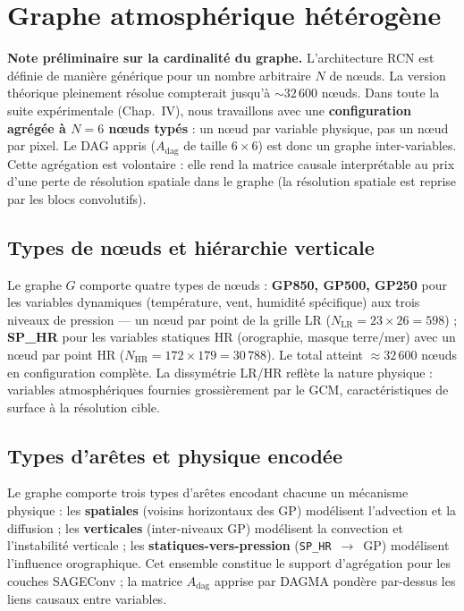 \documentclass[14pt,a4paper,openany]{extreport}
\theoremstyle{definition}
\newcommand{\LR}{\ensuremath{\text{LR}}}
\newcommand{\HR}{\ensuremath{\text{HR}}}
\newcommand{\Adag}{\ensuremath{A_{\mathrm{dag}}}}
\begin{document}
\section{Graphe atmosphérique hétérogène}
\label{sec:oracle-graphe}

\noindent\textbf{Note préliminaire sur la cardinalité du graphe.} L'architecture RCN est définie de manière générique pour un nombre arbitraire $N$ de nœuds. La version théorique pleinement résolue compterait jusqu'à ${\sim}32\,600$ nœuds. Dans toute la suite expérimentale (Chap.~IV), nous travaillons avec une \textbf{configuration agrégée à $N = 6$ nœuds typés} : un nœud par variable physique, pas un nœud par pixel. Le DAG appris ($A_{\mathrm{dag}}$ de taille $6 \times 6$) est donc un graphe inter-variables. Cette agrégation est volontaire : elle rend la matrice causale interprétable au prix d'une perte de résolution spatiale dans le graphe (la résolution spatiale est reprise par les blocs convolutifs).

\subsection{Types de nœuds et hiérarchie verticale}
\label{ssec:oracle-types-noeuds}

Le graphe $G$ comporte quatre types de nœuds : \textbf{GP850, GP500, GP250} pour les variables dynamiques (température, vent, humidité spécifique) aux trois niveaux de pression --- un nœud par point de la grille LR ($N_{\LR} = 23\times 26 = 598$) ; \textbf{SP\_HR} pour les variables statiques HR (orographie, masque terre/mer) avec un nœud par point HR ($N_{\HR} = 172\times 179 = 30\,788$). Le total atteint $\approx 32\,600$ nœuds en configuration complète. La dissymétrie LR/HR reflète la nature physique : variables atmosphériques fournies grossièrement par le GCM, caractéristiques de surface à la résolution cible.

\subsection{Types d'arêtes et physique encodée}
\label{ssec:oracle-types-aretes}

Le graphe comporte trois types d'arêtes encodant chacune un mécanisme physique : les \textbf{spatiales} (voisins horizontaux des GP) modélisent l'advection et la diffusion ; les \textbf{verticales} (inter-niveaux GP) modélisent la convection et l'instabilité verticale ; les \textbf{statiques-vers-pression} (\texttt{SP\_HR}~$\to$~GP) modélisent l'influence orographique. Cet ensemble constitue le support d'agrégation pour les couches SAGEConv ; la matrice $\Adag$ apprise par DAGMA pondère par-dessus les liens causaux entre variables.
\end{document}
